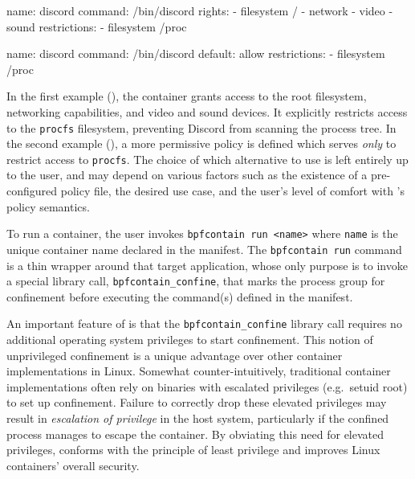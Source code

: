 \begin{listing}[
  language=yaml,
  caption={
    A sample manifest for Discord \cite{discord} using \bpfcontain{}'s more
    restrictive default-deny confinement. All accesses which are not listed
    under the container's rights are implictly denied. The explicit restriction
    on access to \texttt{procfs} prevents Discord from scanning the process
    tree, regardless of its rights.
  },
  label={lst:discord_a},
  gobble=2]
  name: discord
  command: /bin/discord
  rights:
    - filesystem /
    - network
    - video
    - sound
  restrictions:
    - filesystem /proc
\end{listing}

\begin{listing}[
  language=yaml,
  caption={
    A sample manifest for Discord \cite{discord} using \bpfcontain{}'s optional
    default-allow confinement.  This permits a much simpler policy that directly
    targets Discord's \texttt{procfs} scanning behaviour.
  },
  label={lst:discord_b},
  gobble=2]
  name: discord
  command: /bin/discord
  default: allow
  restrictions:
    - filesystem /proc
\end{listing}

In the first example (), the container grants access to the
root filesystem, networking capabilities, and video and sound devices. It
explicitly restricts access to the \texttt{procfs} filesystem, preventing
Discord from scanning the process tree. In the second example
(), a more permissive policy is defined which serves
\textit{only} to restrict access to \texttt{procfs}. The choice of which
alternative to use is left entirely up to the user, and may depend on various
factors such as the existence of a pre-configured policy file, the desired use
case, and the user's level of comfort with \bpfcontain{}'s policy semantics.

To run a \bpfcontain{} container, the user invokes \texttt{bpfcontain run <name>} where
\texttt{name} is the unique container name declared in the manifest.  The
\texttt{bpfcontain run} command is a thin wrapper around that target application,
whose only purpose is to invoke a special library call,
\lstinline[language=c]|bpfcontain_confine|, that marks the process group for
confinement before executing the command(s) defined in the manifest.

An important feature of \bpfcontain{} is that the
\lstinline[language=c]|bpfcontain_confine| library call requires no additional
operating system privileges to start confinement.  This notion of unprivileged
confinement is a unique advantage over other container implementations in Linux.
Somewhat counter-intuitively, traditional container implementations often rely
on binaries with escalated privileges (e.g.~setuid root) to set up confinement.
Failure to correctly drop these elevated privileges may result in
\textit{escalation of privilege} in the host system, particularly if the
confined process manages to escape the container.  By obviating this need for
elevated privileges, \bpfcontain{} conforms with the principle of least
privilege and improves Linux containers' overall security.

